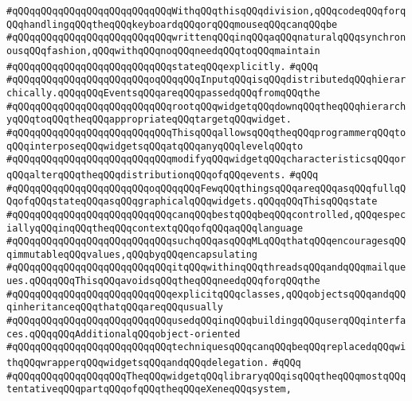 \verb|#qQQqqQQqqQQqqQQqqQQqqQQqqQQqWithqQQqthisqQQqdivision,qQQqcodeqQQqforqQQqhandlingqQQqtheqQQqkeyboardqQQqorqQQqmouseqQQqcanqQQqbe|\newline
\verb|#qQQqqQQqqQQqqQQqqQQqqQQqqQQqwrittenqQQqinqQQqaqQQqnaturalqQQqsynchronousqQQqfashion,qQQqwithqQQqnoqQQqneedqQQqtoqQQqmaintain|\newline
\verb|#qQQqqQQqqQQqqQQqqQQqqQQqqQQqstateqQQqexplicitly.|\newline
\verb|#qQQq|\newline
\verb|#qQQqqQQqqQQqqQQqqQQqqQQqoqQQqqQQqInputqQQqisqQQqdistributedqQQqhierarchically.qQQqqQQqEventsqQQqareqQQqpassedqQQqfromqQQqthe|\newline
\verb|#qQQqqQQqqQQqqQQqqQQqqQQqqQQqrootqQQqwidgetqQQqdownqQQqtheqQQqhierarchyqQQqtoqQQqtheqQQqappropriateqQQqtargetqQQqwidget.|\newline
\verb|#qQQqqQQqqQQqqQQqqQQqqQQqqQQqThisqQQqallowsqQQqtheqQQqprogrammerqQQqtoqQQqinterposeqQQqwidgetsqQQqatqQQqanyqQQqlevelqQQqto|\newline
\verb|#qQQqqQQqqQQqqQQqqQQqqQQqqQQqmodifyqQQqwidgetqQQqcharacteristicsqQQqorqQQqalterqQQqtheqQQqdistributionqQQqofqQQqevents.|\newline
\verb|#qQQq|\newline
\verb|#qQQqqQQqqQQqqQQqqQQqqQQqoqQQqqQQqFewqQQqthingsqQQqareqQQqasqQQqfullqQQqofqQQqstateqQQqasqQQqgraphicalqQQqwidgets.qQQqqQQqThisqQQqstate|\newline
\verb|#qQQqqQQqqQQqqQQqqQQqqQQqqQQqcanqQQqbestqQQqbeqQQqcontrolled,qQQqespeciallyqQQqinqQQqtheqQQqcontextqQQqofqQQqaqQQqlanguage|\newline
\verb|#qQQqqQQqqQQqqQQqqQQqqQQqqQQqsuchqQQqasqQQqMLqQQqthatqQQqencouragesqQQqimmutableqQQqvalues,qQQqbyqQQqencapsulating|\newline
\verb|#qQQqqQQqqQQqqQQqqQQqqQQqqQQqitqQQqwithinqQQqthreadsqQQqandqQQqmailqueues.qQQqqQQqThisqQQqavoidsqQQqtheqQQqneedqQQqforqQQqthe|\newline
\verb|#qQQqqQQqqQQqqQQqqQQqqQQqqQQqexplicitqQQqclasses,qQQqobjectsqQQqandqQQqinheritanceqQQqthatqQQqareqQQqusually|\newline
\verb|#qQQqqQQqqQQqqQQqqQQqqQQqqQQqusedqQQqinqQQqbuildingqQQquserqQQqinterfaces.qQQqqQQqAdditionalqQQqobject-oriented|\newline
\verb|#qQQqqQQqqQQqqQQqqQQqqQQqqQQqtechniquesqQQqcanqQQqbeqQQqreplacedqQQqwithqQQqwrapperqQQqwidgetsqQQqandqQQqdelegation.|\newline
\verb|#qQQq|\newline
\verb|#qQQqqQQqqQQqqQQqqQQqTheqQQqwidgetqQQqlibraryqQQqisqQQqtheqQQqmostqQQqtentativeqQQqpartqQQqofqQQqtheqQQqeXeneqQQqsystem,|\newline
